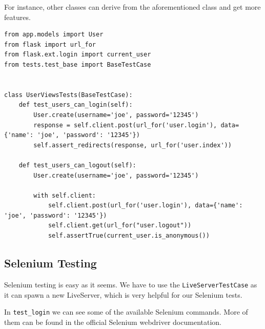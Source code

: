 \documentclass[../main/main.tex]{subfiles}
\begin{document}
For instance, other classes can derive from the aforementioned class and get
more features. 

\begin{lstlisting}
from app.models import User
from flask import url_for
from flask.ext.login import current_user
from tests.test_base import BaseTestCase


class UserViewsTests(BaseTestCase):
    def test_users_can_login(self):
        User.create(username='joe', password='12345')
        response = self.client.post(url_for('user.login'), data={'name': 'joe', 'password': '12345'})
        self.assert_redirects(response, url_for('user.index'))

    def test_users_can_logout(self):
        User.create(username='joe', password='12345')

        with self.client:
            self.client.post(url_for('user.login'), data={'name': 'joe', 'password': '12345'})
            self.client.get(url_for("user.logout"))
            self.assertTrue(current_user.is_anonymous())
\end{lstlisting}

\subsection{Selenium Testing}

Selenium testing is easy as it seems. We have to use the
\lstinline|LiveServerTestCase| as it can spawn a new LiveServer, which is very
helpful for our Selenium tests. 

In \lstinline|test_login| we can see some of the available Selenium commands.
More of them can be found in the official Selenium webdriver documentation. 
\end{document}
